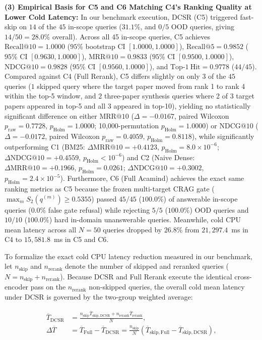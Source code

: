 \documentclass[10pt]{SPIIRAS_Proceedings}
\begin{document}
\textbf{(3) Empirical Basis for C5 and C6 Matching C4's Ranking Quality at Lower Cold Latency:} In our benchmark execution, DCSR (C5) triggered fast-skip on $14$ of the $45$ in-scope queries ($31.1\%$, and $0/5$ OOD queries, giving $14/50 = 28.0\%$ overall). Across all 45 in-scope queries, C5 achieves $\mathrm{Recall@10} = 1.0000$ ($95\%$ bootstrap CI $[1.0000, 1.0000]$), $\mathrm{Recall@5} = 0.9852$ ($95\%$ CI $[0.9630, 1.0000]$), $\mathrm{MRR@10} = 0.9833$ ($95\%$ CI $[0.9500, 1.0000]$), $\mathrm{NDCG@10} = 0.9828$ ($95\%$ CI $[0.9560, 1.0000]$), and $\mathrm{Top\text{-}1\ Hit} = 0.9778$ ($44/45$). Compared against C4 (Full Rerank), C5 differs slightly on only $3$ of the $45$ queries ($1$ skipped query where the target paper moved from rank 1 to rank 4 within the top-5 window, and $2$ three-paper synthesis queries where 2 of 3 target papers appeared in top-5 and all 3 appeared in top-10), yielding no statistically significant difference on either $\mathrm{MRR@10}$ ($\Delta = -0.0167$, paired Wilcoxon $p_{\mathrm{raw}} = 0.7728$, $p_{\mathrm{Holm}} = 1.0000$; 10,000-permutation $p_{\mathrm{Holm}} = 1.0000$) or $\mathrm{NDCG@10}$ ($\Delta = -0.0172$, paired Wilcoxon $p_{\mathrm{raw}} = 0.4059$, $p_{\mathrm{Holm}} = 0.8118$), while significantly outperforming C1 (BM25: $\Delta\mathrm{MRR@10} = +0.4123$, $p_{\mathrm{Holm}} = 8.0 \times 10^{-6}$; $\Delta\mathrm{NDCG@10} = +0.4559$, $p_{\mathrm{Holm}} < 10^{-6}$) and C2 (Naive Dense: $\Delta\mathrm{MRR@10} = +0.1966$, $p_{\mathrm{Holm}} = 0.0261$; $\Delta\mathrm{NDCG@10} = +0.3002$, $p_{\mathrm{Holm}} = 2.4 \times 10^{-5}$). Furthermore, C6 (Full Acamind) achieves the exact same ranking metrics as C5 because the frozen multi-target CRAG gate ($\max_m S_2(q^{(m)}) \ge 0.5355$) passed $45/45$ ($100.0\%$) of answerable in-scope queries ($0.0\%$ false gate refusal) while rejecting $5/5$ ($100.0\%$) OOD queries and $10/10$ ($100.0\%$) hard in-domain unanswerable queries. Meanwhile, cold CPU mean latency across all $N = 50$ queries dropped by $26.8\%$ from $21,297.4$~ms in C4 to $15,581.8$~ms in C5 and C6.

To formalize the exact cold CPU latency reduction measured in our benchmark, let $n_{\mathrm{skip}}$ and $n_{\mathrm{rerank}}$ denote the number of skipped and reranked queries ($N = n_{\mathrm{skip}} + n_{\mathrm{rerank}}$). Because DCSR and Full Rerank execute the identical cross-encoder pass on the $n_{\mathrm{rerank}}$ non-skipped queries, the overall cold mean latency under DCSR is governed by the two-group weighted average:

\begin{equation}
\begin{aligned}
\overline{T}_{\mathrm{DCSR}} &= \frac{n_{\mathrm{skip}} \overline{T}_{\mathrm{skip, DCSR}} + n_{\mathrm{rerank}} \overline{T}_{\mathrm{rerank}}}{N}, \\
\Delta\overline{T} &= \overline{T}_{\mathrm{Full}} - \overline{T}_{\mathrm{DCSR}} = \frac{n_{\mathrm{skip}}}{N}\left(\overline{T}_{\mathrm{skip, Full}} - \overline{T}_{\mathrm{skip, DCSR}}\right),
\end{aligned}
\label{eq:cold_weighted_mean}
\end{equation}
\end{document}
